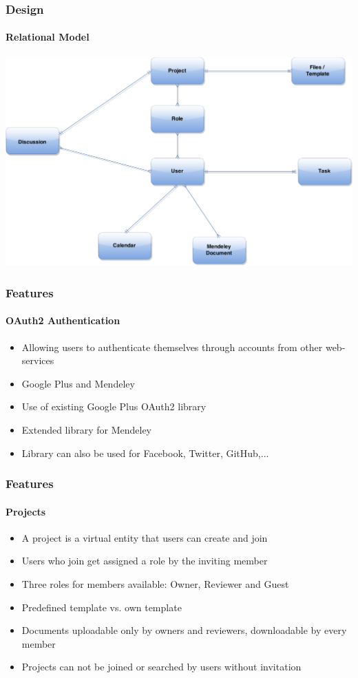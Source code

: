 \documentclass{beamer}
\begin{document}
\begin{frame}
\frametitle{Design}\framesubtitle{Relational Model}
\centering
\includegraphics[scale=0.15]{./images/RMA.png}
\end{frame}

\begin{frame}
\frametitle{Features}
\framesubtitle{OAuth2 Authentication}
	\begin{itemize}
		\item Allowing users to authenticate themselves through accounts from other web-services
		\item Google Plus and Mendeley
		\item Use of existing Google Plus OAuth2 library
		\item Extended library for Mendeley
		\item Library can also be used for Facebook, Twitter, GitHub,...
	\end{itemize}
\end{frame}

\begin{frame}
\frametitle{Features}
\framesubtitle{Projects}
	\begin{itemize}
		\item A project is a virtual entity that users can create and join
		\item Users who join get assigned a role by the inviting member
		\item Three roles for members available: Owner, Reviewer and Guest
		\item Predefined template vs. own template
		\item Documents uploadable only by owners and reviewers, downloadable by every member
		\item Projects can not be joined or searched by users without invitation
	\end{itemize}
\end{frame}
\end{document}
